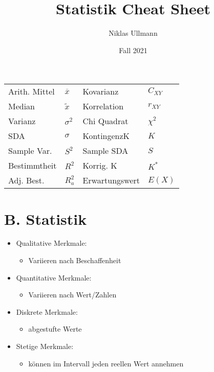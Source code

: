 \documentclass[a4paper]{article}
\title{Statistik Cheat Sheet}
\author{Niklas Ullmann}
\date{Fall 2021}
\begin{document}
\begin{landscape}
    \thispagestyle{empty}

    \begin{multicols}{4}
        \begin{center}
            \begin{tabular}{ll|ll}
                Arith. Mittel & $\overline{x}$  & Kovarianz &  $C_{XY}$\\
                Median      & $\widetilde{x}$ &  Korrelation     & $r_{XY}$  \\
                Varianz      & $\sigma^2$ &  Chi Quadrat     &  $\chi^2$\\
                SDA      &  $\sigma$&  KontingenzK    & $K$ \\
                Sample Var.& $S^2$& Sample SDA& $S$ \\
                Bestimmtheit& $R^2$&Korrig. K& $K^*$\\
                Adj. Best. & $R^2_a$& Erwartungswert& $E(X)$
                \end{tabular}
        \end{center}
    \section{B. Statistik}
        \begin{itemize}[noitemsep,nolistsep,leftmargin=*]
            \item Qualitative Merkmale: 
                \begin{itemize}[noitemsep,nolistsep,leftmargin=*]
                    \item Variieren nach Beschaffenheit
                \end{itemize}
            \item Quantitative Merkmale:
                \begin{itemize}[noitemsep,nolistsep]
                    \item Variieren nach Wert/Zahlen
                \end{itemize}
        \end{itemize}
        \begin{itemize}[noitemsep,nolistsep,leftmargin=*]
            \item Diskrete Merkmale: 
                \begin{itemize}[noitemsep,nolistsep,leftmargin=*]
                    \item abgestufte Werte
                \end{itemize}
            \item Stetige Merkmale:
                \begin{itemize}[noitemsep,nolistsep,leftmargin=*]
                    \item können im Intervall jeden reellen Wert annehmen
                \end{itemize}
        \end{itemize}

\end{multicols}
\end{landscape}
\end{document}
